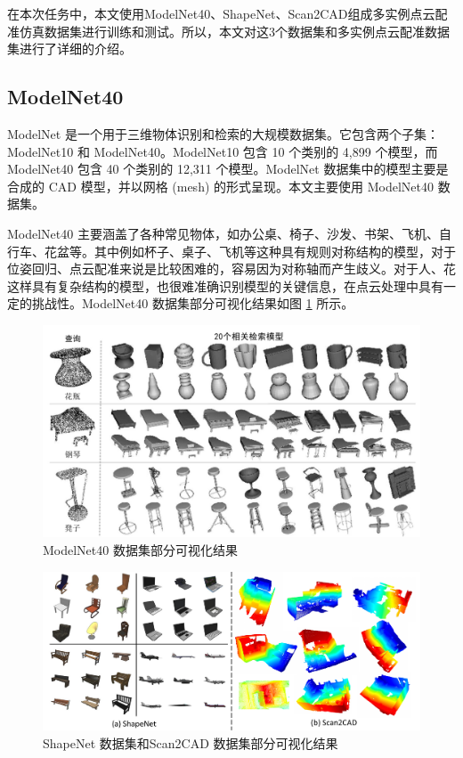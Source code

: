 在本次任务中，本文使用ModelNet40、ShapeNet、Scan2CAD组成多实例点云配准仿真数据集进行训练和测试。所以，本文对这3个数据集和多实例点云配准数据集进行了详细的介绍。

\label{sec:dataset}

\subsection{ModelNet40}
ModelNet 是一个用于三维物体识别和检索的大规模数据集。它包含两个子集：ModelNet10 和 ModelNet40。ModelNet10 包含 10 个类别的 4,899 个模型，而 ModelNet40 包含 40 个类别的 12,311 个模型。ModelNet 数据集中的模型主要是合成的 CAD 模型，并以网格 (mesh) 的形式呈现。本文主要使用 ModelNet40 数据集。 

ModelNet40 主要涵盖了各种常见物体，如办公桌、椅子、沙发、书架、飞机、自行车、花盆等。其中例如杯子、桌子、飞机等这种具有规则对称结构的模型，对于位姿回归、点云配准来说是比较困难的，容易因为对称轴而产生歧义。对于人、花这样具有复杂结构的模型，也很难准确识别模型的关键信息，在点云处理中具有一定的挑战性。ModelNet40 数据集部分可视化结果如图 \ref{fig:modelnet} 所示。

\begin{figure}
    \centering
    \includegraphics[width=\textwidth]{images/ModelNet.pdf}
    \caption{ModelNet40 数据集部分可视化结果}
    \label{fig:modelnet}
    \vspace{-0.5cm}
\end{figure}

\begin{figure}
    \centering
    \includegraphics[width=\textwidth]{images/Shapenet-Scan2CAD.pdf}
    \caption{ShapeNet 数据集和Scan2CAD 数据集部分可视化结果}
    \label{fig:ShapeNet&Scan2CAD}
    \vspace{-0.5cm}
\end{figure}
